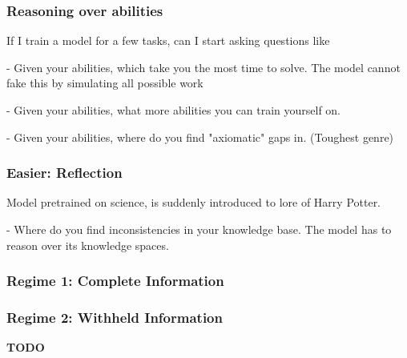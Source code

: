 \documentclass{article}
\begin{document}

\subsubsection{Reasoning over abilities}
If I train a model for a few tasks, can I start asking questions like

- Given your abilities, which take you the most time to solve. The model cannot
fake this by simulating all possible work

- Given your abilities, what more abilities you can train yourself on.

- Given your abilities, where do you find "axiomatic" gaps in. (Toughest genre)

\subsubsection{Easier: Reflection}
Model pretrained on science, is suddenly introduced to lore of Harry Potter.

- Where do you find inconsistencies in your knowledge base. The model has to
reason over its knowledge spaces.

\subsubsection{Regime 1: Complete Information}
%
%


\subsubsection{Regime 2: Withheld Information}
%
%

\textbf{TODO}
\end{document}
